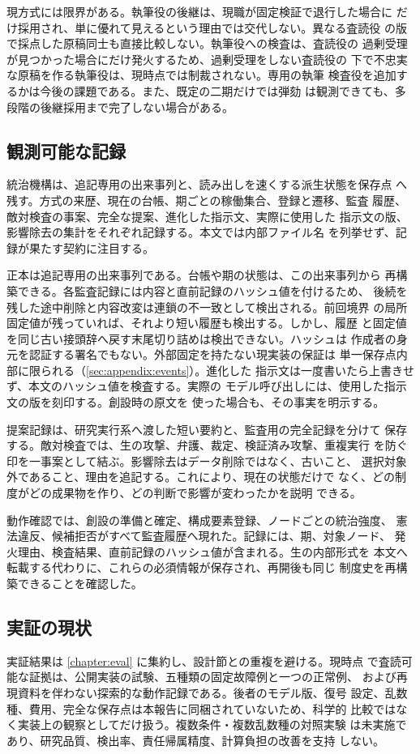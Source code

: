現方式には限界がある。執筆役の後継は、現職が固定検証で退行した場合に
だけ採用され、単に優れて見えるという理由では交代しない。異なる査読役
の版で採点した原稿同士も直接比較しない。執筆役への検査は、査読役の
過剰受理が見つかった場合にだけ発火するため、過剰受理をしない査読役の
下で不忠実な原稿を作る執筆役は、現時点では制裁されない。専用の執筆
検査役を追加するかは今後の課題である。また、既定の二期だけでは弾劾
は観測できても、多段階の後継採用まで完了しない場合がある。

\subsection{観測可能な記録}\label{sec:rqgm:observability}

統治機構は、追記専用の出来事列と、読み出しを速くする派生状態を保存点
へ残す。方式の来歴、現在の台帳、期ごとの稼働集合、登録と遷移、監査
履歴、敵対検査の事案、完全な提案、進化した指示文、実際に使用した
指示文の版、影響除去の集計をそれぞれ記録する。本文では内部ファイル名
を列挙せず、記録が果たす契約に注目する。

正本は追記専用の出来事列である。台帳や期の状態は、この出来事列から
再構築できる。各監査記録には内容と直前記録のハッシュ値を付けるため、
後続を残した途中削除と内容改変は連鎖の不一致として検出される。前回境界
の局所固定値が残っていれば、それより短い履歴も検出する。しかし、履歴
と固定値を同じ古い接頭辞へ戻す末尾切り詰めは検出できない。ハッシュは
作成者の身元を認証する署名でもない。外部固定を持たない現実装の保証は
単一保存点内部に限られる（\cref{sec:appendix:events}）。進化した
指示文は一度書いたら上書きせず、本文のハッシュ値を検査する。実際の
モデル呼び出しには、使用した指示文の版を刻印する。創設時の原文を
使った場合も、その事実を明示する。

提案記録は、研究実行系へ渡した短い要約と、監査用の完全記録を分けて
保存する。敵対検査では、生の攻撃、弁護、裁定、検証済み攻撃、重複実行
を防ぐ印を一事案として結ぶ。影響除去はデータ削除ではなく、古いこと、
選択対象外であること、理由を追記する。これにより、現在の状態だけで
なく、どの制度がどの成果物を作り、どの判断で影響が変わったかを説明
できる。

動作確認では、創設の準備と確定、構成要素登録、ノードごとの統治強度、
憲法違反、候補拒否がすべて監査履歴へ現れた。記録には、期、対象ノード、
発火理由、検査結果、直前記録のハッシュ値が含まれる。生の内部形式を
本文へ転載する代わりに、これらの必須情報が保存され、再開後も同じ
制度史を再構築できることを確認した。

\subsection{実証の現状}\label{sec:rqgm:empirical}

実証結果は \cref{chapter:eval} に集約し、設計節との重複を避ける。現時点
で査読可能な証拠は、公開実装の試験、五種類の固定故障例と一つの正常例、
および再現資料を伴わない探索的な動作記録である。後者のモデル版、復号
設定、乱数種、費用、完全な保存点は本報告に同梱されていないため、科学的
比較ではなく実装上の観察としてだけ扱う。複数条件・複数乱数種の対照実験
は未実施であり、研究品質、検出率、責任帰属精度、計算負担の改善を支持
しない。
